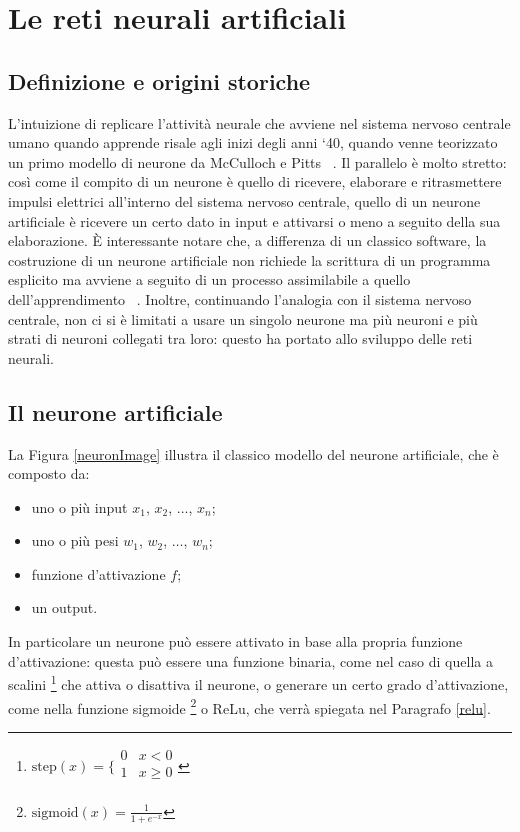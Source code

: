 \documentclass[12pt]{report}
\begin{document}
\chapter{Le reti neurali artificiali}

\section{Definizione e origini storiche}
L’intuizione di replicare l’attività neurale che avviene nel sistema nervoso centrale umano quando apprende risale agli inizi degli anni ‘40, quando venne teorizzato un primo modello di neurone da McCulloch e Pitts ~\cite{McCulloch}. Il parallelo è molto stretto: così come il compito di un neurone è quello di ricevere, elaborare e ritrasmettere impulsi elettrici all’interno del sistema nervoso centrale, quello di un neurone artificiale è ricevere un certo dato in input e attivarsi o meno a seguito della sua elaborazione.
È interessante notare che, a differenza di un classico software, la costruzione di un neurone artificiale non richiede la scrittura di un programma esplicito ma avviene a seguito di un processo assimilabile a quello dell'apprendimento ~\cite{Rosenblatt}. Inoltre, continuando l'analogia con il sistema nervoso centrale, non ci si è limitati a usare un singolo neurone ma più neuroni e più strati di neuroni collegati tra loro: questo ha portato allo sviluppo delle reti neurali.


\section{Il neurone artificiale}
La Figura \ref{neuronImage} illustra il classico modello del neurone artificiale, che è composto da:
\begin{itemize}
\item{uno o più input $x_1$, $x_2$, $\dots$, $x_n$};
\item{uno o più pesi $w_1$, $w_2$, $\dots$, $w_n$};
\item{funzione d'attivazione $f$};
\item{un output}.
\end{itemize}

In particolare un neurone può essere attivato in base alla propria funzione d'attivazione: questa può essere una funzione binaria, come nel caso di quella a scalini \footnote{$\mathrm{step}(x) =
\bigg \{
\begin{array}{rl}
0 & x < 0 \\
1 & x \geq 0 \\
\end{array}
$} che attiva o disattiva il neurone, o generare un certo grado d'attivazione, come nella funzione sigmoide \footnote{$\displaystyle \mathrm{sigmoid}(x) = \frac{1}{1 + e^{-x}}$} o ReLu, che verrà spiegata nel Paragrafo \ref{relu}.
\end{document}
